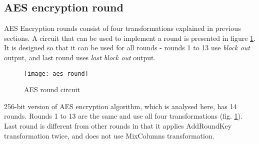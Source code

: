 \subsection{AES encryption round}

AES Encryption rounds consist of four transformations explained in previous sections. A circuit that can be used to implement a round is presented in figure \ref{fig:aes-round}. It is designed so that it can be used for all rounds - rounds 1 to 13 use \textit{block out} output, and last round uses \textit{last block out} output.

\begin{figure}[!H]
\centering
\texttt{[image: aes-round]}
\caption{AES round circuit}
\label{fig:aes-round}
\end{figure}

256-bit version of AES encryption algorithm, which is analysed here, has 14 rounds. Rounds 1 to 13 are the same and use all four transformations (fig. \ref{fig:aes-round}). Last round is different from other rounds in that it applies AddRoundKey transformation twice, and does not use MixColumns transformation.


